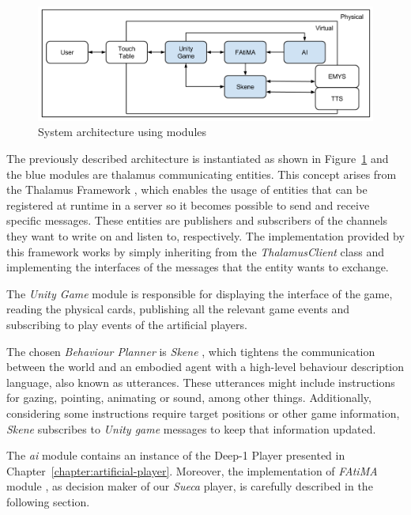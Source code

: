 \begin{figure}[ht]
  \centering
    \includegraphics[width=1\textwidth]{./img/6/model}
  \caption{System architecture using modules}
\label{fig:model}
\end{figure}

The previously described architecture is instantiated as shown in Figure~\ref{fig:model} and the blue modules are thalamus communicating entities.
This concept arises from the Thalamus Framework \cite{Ribeiro}, which enables the usage of entities that can be registered at runtime in a server so it becomes possible to send and receive specific messages.
These entities are publishers and subscribers of the channels they want to write on and listen to, respectively.
The implementation provided by this framework works by simply inheriting from the \emph{ThalamusClient} class and implementing the interfaces of the messages that the entity wants to exchange.

The \emph{Unity Game} module is responsible for displaying the interface of the game, reading the physical cards, publishing all the relevant game events and subscribing to play events of the artificial players.

The chosen \emph{Behaviour Planner} is \emph{Skene} \cite{Ribeiroa}, which tightens the communication between the world and an embodied agent with a high-level behaviour description language, also known as utterances.
These utterances might include instructions for gazing, pointing, animating or sound, among other things.
Additionally, considering some instructions require target positions or other game information, \emph{Skene} subscribes to \emph{Unity game} messages to keep that information updated.

The \emph{\ac{ai}} module contains an instance of the Deep-1 Player presented in Chapter~\ref{chapter:artificial-player}.
Moreover, the implementation of \emph{FAtiMA} module \cite{Dias2011}, as decision maker of our \emph{Sueca} player, is carefully described in the following section.
